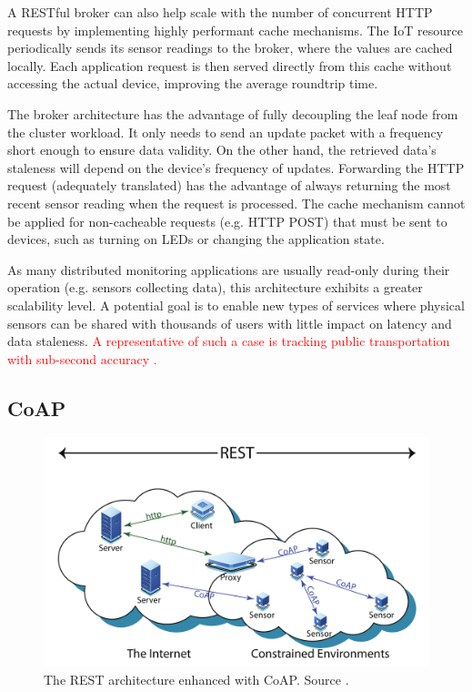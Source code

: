 A RESTful broker can also help scale with the number of concurrent HTTP requests by implementing highly performant cache mechanisms. The IoT resource periodically sends its sensor readings to the broker, where the values are cached locally. Each application request is then served directly from this cache without accessing the actual device, improving the average roundtrip time.

The broker architecture has the advantage of fully decoupling the leaf node from the cluster workload. It only needs to send an update packet with a frequency short enough to ensure data validity. On the other hand, the retrieved data's staleness will depend on the device's frequency of updates. Forwarding the HTTP request (adequately translated) has the advantage of always returning the most recent sensor reading when the request is processed. The cache mechanism cannot be applied for non-cacheable requests (e.g. HTTP POST) that must be sent to devices, such as turning on LEDs or changing the application state.

As many distributed monitoring applications are usually read-only during their operation (e.g. sensors collecting data), this architecture exhibits a greater scalability level. A potential goal is to enable new types of services where physical sensors can be shared with thousands of users with little impact on latency and data staleness. \textcolor{red}{A representative of such a case is tracking public transportation with sub-second accuracy \cite{elbamby2019wireless}.}

\subsection{CoAP}
\label{sec:coap}

\begin{figure}[ht]
\centering
\includegraphics[width=\columnwidth]{figures/coap}
\caption{The REST architecture enhanced with CoAP. Source \cite{bormann2012coap}.}
\label{fig:coap}
\end{figure}

